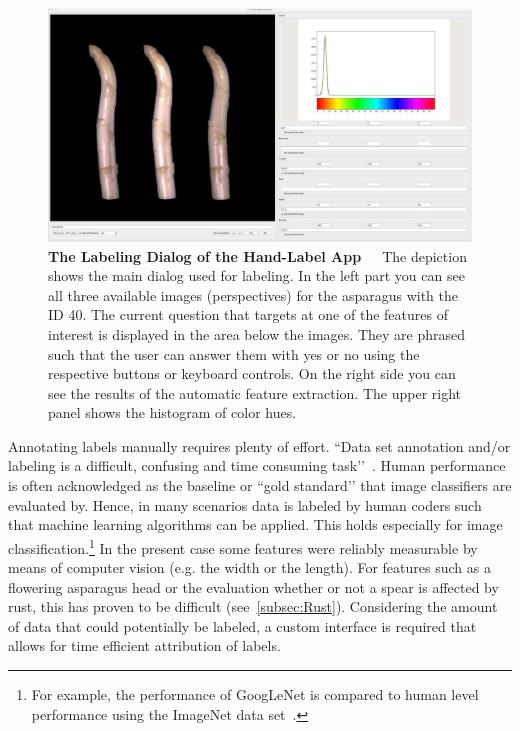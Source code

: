 \begin{figure}[h]
	\centering
	\includegraphics[scale=0.3]{Figures/chapter03/labelapp_example.png}
	\decoRule
	\caption[The Labeling Dialog of the Hand-Label App]{\textbf{The Labeling Dialog of the Hand-Label App}~~~The depiction shows the main dialog used for labeling. In the left part you can see all three available images (perspectives) for the asparagus with the ID 40. The current question that targets at one of the features of interest is displayed in the area below the images. They are phrased such that the user can answer them with yes or no using the respective buttons or keyboard controls. On the right side you can see the results of the automatic feature extraction. The upper right panel shows the histogram of color hues.}
	\label{fig:LabelAppGUI}
\end{figure}

\bigskip
Annotating labels manually requires plenty of effort. ``Data set annotation and/or labeling is a difficult, confusing and time consuming task’’~\citep{al2018labeling}. Human performance is often acknowledged as the baseline or ``gold standard’’ that image classifiers are evaluated by. Hence, in many scenarios data is labeled by human coders such that machine learning algorithms can be applied. This holds especially for image classification.\footnote{For example, the performance of GoogLeNet is compared to human level performance using the ImageNet data set~\citep{russakovsky2015imagenet}.} In the present case some features were reliably measurable by means of computer vision (e.g. the width or the length). For features such as a flowering asparagus head or the evaluation whether or not a spear is affected by rust, this has proven to be difficult (see~\autoref{subsec:Rust}). Considering the amount of data that could potentially be labeled, a custom interface is required that allows for time efficient attribution of labels.

